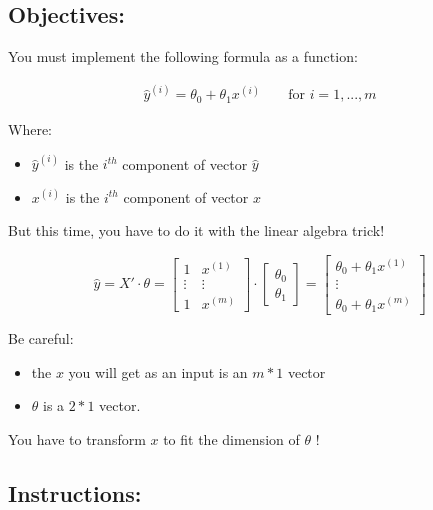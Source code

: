 \documentclass[]{article}
\begin{document}
\hypertarget{objectives}{%
\subsection{Objectives:}\label{objectives}}

You must implement the following formula as a function:

\large

\[
\begin{matrix}
\hat{y}^{(i)} = \theta_0 + \theta_1 x^{(i)} & &\text{ for $i = 1, ..., m$}
\end{matrix}
\] \normalsize

Where:

\begin{itemize}
\item
  \(\hat{y}^{(i)}\) is the \(i^{th}\) component of vector \(\hat{y}\)
\item
  \(x^{(i)}\) is the \(i^{th}\) component of vector \(x\)
\end{itemize}

But this time, you have to do it with the linear algebra trick!

\large

\[
\hat{y} = X' \cdot \theta = \begin{bmatrix} 1 & x^{(1)} \\ \vdots & \vdots \\ 1 & x^{(m)}\end{bmatrix}\cdot\begin{bmatrix}\theta_0 \\ \theta_1 \end{bmatrix} = \begin{bmatrix} \theta_0 + \theta_1 x^{(1)} \\ \vdots \\ \theta_0 + \theta_1 x^{(m)} \end{bmatrix}
\] \normalsize

Be careful:

\begin{itemize}
\item
  the \(x\) you will get as an input is an \(m * 1\) vector
\item
  \(\theta\) is a \(2 * 1\) vector.
\end{itemize}

You have to transform \(x\) to fit the dimension of \(\theta\) !

\hypertarget{instructions}{%
\subsection{Instructions:}\label{instructions}}
\end{document}
